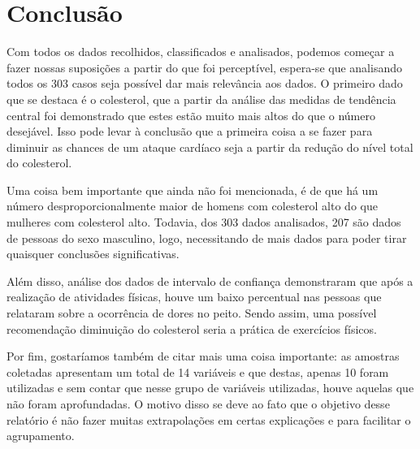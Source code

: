 
\chapter*[Conclusão]{Conclusão}

    Com todos os dados recolhidos, classificados e analisados, podemos começar a fazer 
    nossas suposições a partir do que foi perceptível, espera-se que analisando todos os 
    303 casos seja possível dar mais relevância aos dados. O primeiro dado que se destaca 
    é o colesterol, que a partir da análise das medidas de tendência central foi demonstrado 
    que estes estão muito mais altos do que o número desejável. Isso pode levar à conclusão 
    que a primeira coisa a se fazer para diminuir as chances de um ataque cardíaco seja a 
    partir da redução do nível total do colesterol.

    Uma coisa bem importante que ainda não foi mencionada, é de que há um número desproporcionalmente 
    maior de homens com colesterol alto do que mulheres com colesterol alto. Todavia, dos 303 dados 
    analisados, 207 são dados de pessoas do sexo masculino, logo, necessitando de mais dados para poder 
    tirar quaisquer conclusões significativas.

    Além disso, análise dos dados de intervalo de confiança demonstraram que após a realização de 
    atividades físicas, houve um baixo percentual nas pessoas que relataram sobre a ocorrência de 
    dores no peito. Sendo assim, uma possível recomendação diminuição do colesterol seria a prática
    de exercícios físicos.
    
    Por fim, gostaríamos também de citar mais uma coisa importante: as amostras coletadas apresentam 
    um total de 14 variáveis e que destas, apenas 10 foram utilizadas e sem contar que nesse grupo de 
    variáveis utilizadas, houve aquelas que não foram aprofundadas. O motivo disso se deve ao fato que 
    o objetivo desse relatório é não fazer muitas extrapolações em certas explicações e para facilitar 
    o agrupamento.
    